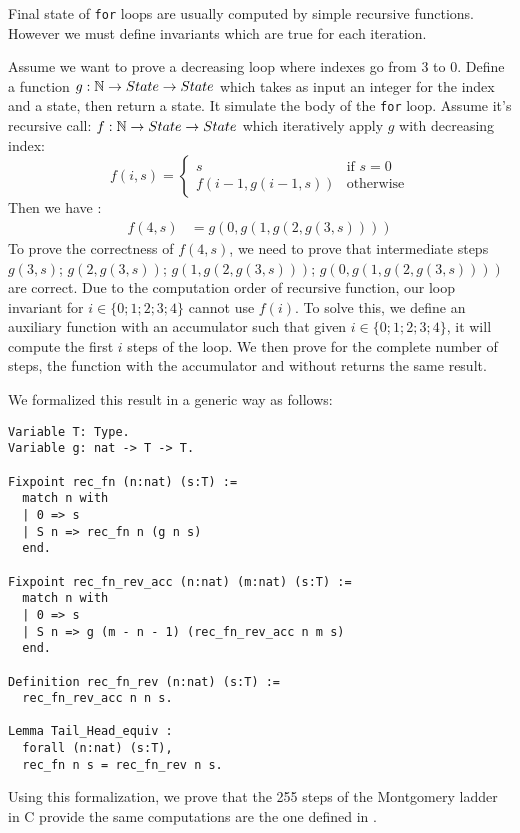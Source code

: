 Final state of \texttt{for} loops are usually computed by simple recursive functions.
However we must define invariants which are true for each iteration.

Assume we want to prove a decreasing loop where indexes go from 3 to 0.
Define a function $g : \mathbb{N} \rightarrow State  \rightarrow State $ which takes as input an integer for the index and a state,
then return a state. It simulate the body of the \texttt{for} loop.
Assume it's recursive call: $f : \mathbb{N} \rightarrow State \rightarrow State $ which iteratively apply $g$ with decreasing index:
\begin{equation*}
  f ( i , s ) =
  \begin{cases}
  s & \text{if } s = 0 \\
  f( i - 1 , g ( i - 1  , s )) & \text{otherwise}
  \end{cases}
\end{equation*}
Then we have :
\begin{align*}
  f(4,s) &= g(0,g(1,g(2,g(3,s))))
\end{align*}
To prove the correctness of $f(4,s)$, we need to prove that intermediate steps
$g(3,s)$; $g(2,g(3,s))$; $g(1,g(2,g(3,s)))$; $g(0,g(1,g(2,g(3,s))))$ are correct.
Due to the computation order of recursive function, our loop invariant for $i\in\{0;1;2;3;4\}$ cannot use $f(i)$.
To solve this, we define an auxiliary function with an accumulator such that given $i\in\{0;1;2;3;4\}$, it will compute the first $i$ steps of the loop.
We then prove for the complete number of steps, the function with the accumulator and without returns the same result.

We formalized this result in a generic way as follows:
\begin{lstlisting}[language=Coq]
Variable T: Type.
Variable g: nat -> T -> T.

Fixpoint rec_fn (n:nat) (s:T) :=
  match n with
  | 0 => s
  | S n => rec_fn n (g n s)
  end.

Fixpoint rec_fn_rev_acc (n:nat) (m:nat) (s:T) :=
  match n with
  | 0 => s
  | S n => g (m - n - 1) (rec_fn_rev_acc n m s)
  end.

Definition rec_fn_rev (n:nat) (s:T) :=
  rec_fn_rev_acc n n s.

Lemma Tail_Head_equiv :
  forall (n:nat) (s:T),
  rec_fn n s = rec_fn_rev n s.
\end{lstlisting}
Using this formalization, we prove that the 255 steps of the Montgomery ladder
in C provide the same computations are the one defined in .

